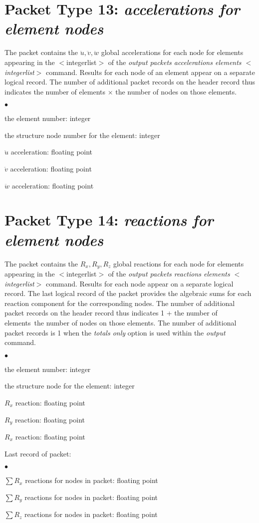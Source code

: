 \documentclass[10pt]{report}
\numberwithin{equation}{section}
\newcommand{\ti}{\emph}
\newcommand{\squishlist}{
 \begin{list}{$\bullet$}
  { \setlength{\itemsep}{0pt}
     \setlength{\parsep}{3pt}
     \setlength{\topsep}{3pt}
     \setlength{\partopsep}{0pt}
     \setlength{\leftmargin}{1.5em}
     \setlength{\labelwidth}{1em}
     \setlength{\labelsep}{0.5em} } }
\newcommand{\squishend}{
  \end{list}  }
\begin{document}
\section{Packet Type 13: \ti{accelerations for element nodes}}
The packet contains the $\ddot u, \ddot v, \ddot w$ global accelerations for 
each node for elements appearing in the $<$integerlist$>$ of 
the \ti{output packets accelerations elements  $<$integerlist$>$ } 
command. Results for each node of an element appear on a separate 
logical record. The number of additional packet records on the header 
record thus indicates the number of elements $\times$ the number of nodes 
on those elements.
\squishlist
\item the element number:  integer
\item the structure node number for the element:  integer
\item $\ddot u$ acceleration:  floating point
\item $\ddot v$ acceleration:  floating point
\item $\ddot w$ acceleration:  floating point
\squishend

%
%
\section{Packet Type 14: \ti{reactions for element nodes}}
The packet contains the $R_x, R_y, R_z$ global reactions for each node 
for elements appearing in the $<$integerlist$>$ of the 
\ti{output packets reactions elements $<$integerlist$>$ } command. 
Results for each node appear on a separate logical record. The last 
logical record of the packet provides the algebraic sums for each reaction component 
for the corresponding nodes. The number of additional packet records on the 
header record thus indicates 1 + the number of elements~the number 
of nodes on those elements. The number of additional packet records is 1 
when the \ti{totals only} option is used within the \ti{output} command.
\squishlist
\item the element number:  integer
\item the structure node for the element:  integer
\item $R_x$ reaction:  floating point
\item $R_y$ reaction:  floating point
\item  $R_x$ reaction:  floating point
\squishend
\noindent Last record of packet:
\squishlist
\item  $\sum R_x$ reactions for nodes in packet:  floating point
\item  $\sum R_y$ reactions for nodes in packet:  floating point
\item  $\sum R_z$ reactions for nodes in packet:  floating point
\squishend
\end{document}
